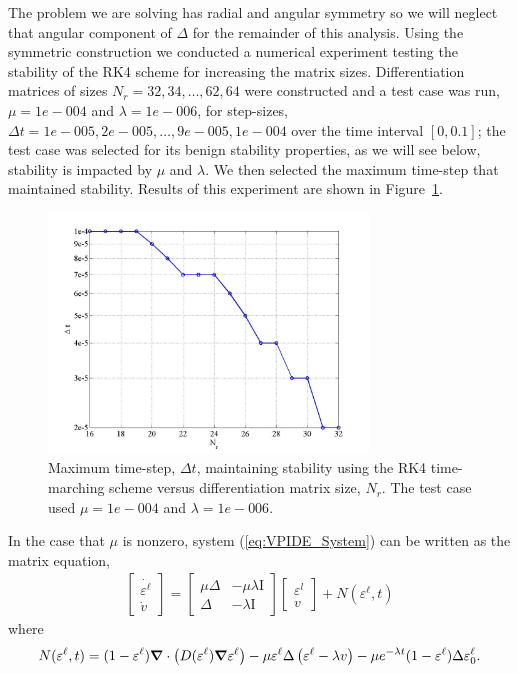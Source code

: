 \documentclass[12pt]{article}
\def\bnab{\mbox{\boldmath$\nabla$}}
\def\e{\varepsilon}
\renewcommand\l{\ell}
\begin{document}
The problem we are solving has radial and angular symmetry so we will neglect that angular component of $\Delta$ for the remainder of this analysis. Using the symmetric construction we conducted a numerical experiment testing the stability of the RK4 scheme for increasing the matrix sizes. Differentiation matrices of sizes $N_r = 32, 34, \ldots, 62, 64$ were constructed and a test case was run, $\mu = 1e-004$ and $\lambda = 1e-006$, for step-sizes, $\Delta t = 1e-005, 2e-005, \ldots, 9e-005, 1e-004$ over the time interval $[0, 0.1]$; the test case was selected for its benign stability properties, as we will see below, stability is impacted by $\mu$ and $\lambda$. We then selected the maximum time-step that maintained stability. Results of this experiment are shown in Figure~\ref{fig:Delta_t_Vs_Nr}.

\begin{figure}
\begin{center}
\includegraphics[width=8.5cm,clip]{20090805_Delta_t_Vs_Nr_stability}
\end{center}
\caption{Maximum time-step, $\Delta t$, maintaining stability using the RK4 time-marching scheme versus differentiation matrix size, $N_r$. The test case used $\mu = 1e-004$ and $\lambda = 1e-006$.}\label{fig:Delta_t_Vs_Nr}
\end{figure}


In the case that $\mu$ is nonzero, system (\ref{eq:VPIDE_System}) can be written as the matrix equation,
\begin{align*}
\begin{bmatrix}
\dot{\e^\l} \\
\dot{v}
\end{bmatrix} =
\begin{bmatrix}
\mu\Delta & -\mu\lambda\mbox{I}\\
\Delta & -\lambda\mbox{I}
\end{bmatrix}
\begin{bmatrix}
\e^l\\
v
\end{bmatrix}+N(\e^\l,t)
\end{align*}
where
\[
N(\e^\l,t) = (1-\e^\l)\bnab\cdot\left(D(\e^\l)\bnab\e^\l\right) - \mu\e^\l\Delta\left(\e^\l - \lambda v\right) -\mu e^{-\lambda t}(1-\e^\l)\Delta\e^\l_0.
\]
\end{document}
